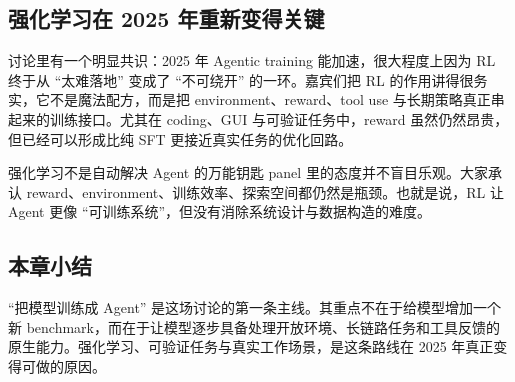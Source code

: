 \subsection{强化学习在 2025 年重新变得关键}
讨论里有一个明显共识：2025 年 Agentic training 能加速，很大程度上因为 RL 终于从 ``太难落地'' 变成了 ``不可绕开'' 的一环。嘉宾们把 RL 的作用讲得很务实，它不是魔法配方，而是把 environment、reward、tool use 与长期策略真正串起来的训练接口。尤其在 coding、GUI 与可验证任务中，reward 虽然仍然昂贵，但已经可以形成比纯 SFT 更接近真实任务的优化回路。

\begin{warningbox}{强化学习不是自动解决 Agent 的万能钥匙}
panel 里的态度并不盲目乐观。大家承认 reward、environment、训练效率、探索空间都仍然是瓶颈。也就是说，RL 让 Agent 更像 ``可训练系统''，但没有消除系统设计与数据构造的难度。
\end{warningbox}

\subsection{本章小结}
``把模型训练成 Agent'' 是这场讨论的第一条主线。其重点不在于给模型增加一个新 benchmark，而在于让模型逐步具备处理开放环境、长链路任务和工具反馈的原生能力。强化学习、可验证任务与真实工作场景，是这条路线在 2025 年真正变得可做的原因。

